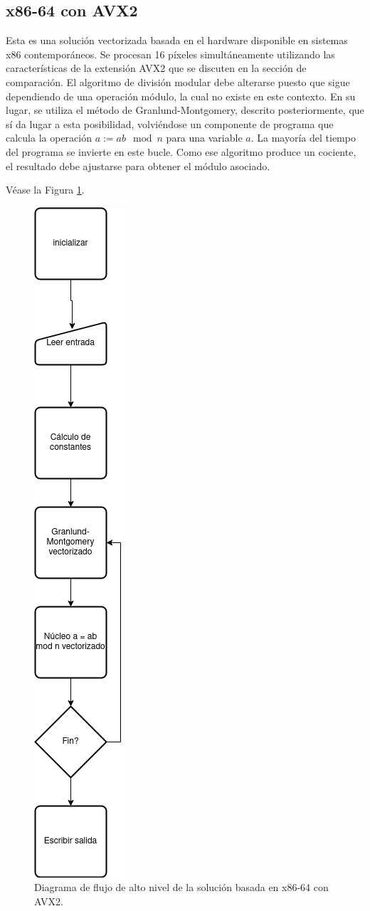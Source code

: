 \documentclass[conference, 14pt]{IEEEtran}
\begin{document}
\subsection{x86-64 con AVX2}

Esta es una solución vectorizada basada en el hardware disponible en sistemas
	  x86 contemporáneos. Se procesan 16 píxeles simultáneamente utilizando las
	  características de la extensión AVX2 que se discuten en la sección de
	  comparación. El algoritmo de división modular debe alterarse puesto que
	  sigue dependiendo de una operación módulo, la cual no existe en este
	  contexto. En su lugar, se utiliza el método de Granlund-Montgomery,
	  descrito posteriormente, que sí da lugar a esta posibilidad, volviéndose
	  un componente de programa que calcula la operación $a := ab \mod n$ para
	  una variable $a$. La mayoría del tiempo del programa se invierte en este
	  bucle. Como ese algoritmo produce un cociente, el resultado debe
	  ajustarse para obtener el módulo asociado.

	  Véase la Figura \ref{fig:x86}.
	  \begin{figure}[H]
        \centering
		\caption{\label{fig:x86}Diagrama de flujo de alto nivel de la solución basada en x86-64 con AVX2.}
		\includegraphics[width=.2\columnwidth]{diag-x86}
	  \end{figure}
\end{document}
